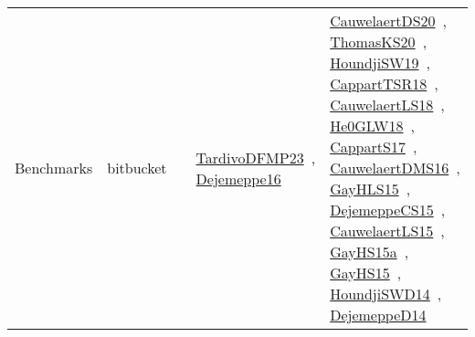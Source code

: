 {\begin{longtable}{lp{3cm}>{\raggedright\arraybackslash}p{6cm}>{\raggedright\arraybackslash}p{6cm}>{\raggedright\arraybackslash}p{8cm}}
Benchmarks & bitbucket &  & \href{../works/TardivoDFMP23.pdf}{TardivoDFMP23}~\cite{TardivoDFMP23}, \href{../works/Dejemeppe16.pdf}{Dejemeppe16}~\cite{Dejemeppe16} & \href{../works/CauwelaertDS20.pdf}{CauwelaertDS20}~\cite{CauwelaertDS20}, \href{../works/ThomasKS20.pdf}{ThomasKS20}~\cite{ThomasKS20}, \href{../works/HoundjiSW19.pdf}{HoundjiSW19}~\cite{HoundjiSW19}, \href{../works/CappartTSR18.pdf}{CappartTSR18}~\cite{CappartTSR18}, \href{../works/CauwelaertLS18.pdf}{CauwelaertLS18}~\cite{CauwelaertLS18}, \href{../works/He0GLW18.pdf}{He0GLW18}~\cite{He0GLW18}, \href{../works/CappartS17.pdf}{CappartS17}~\cite{CappartS17}, \href{../works/CauwelaertDMS16.pdf}{CauwelaertDMS16}~\cite{CauwelaertDMS16}, \href{../works/GayHLS15.pdf}{GayHLS15}~\cite{GayHLS15}, \href{../works/DejemeppeCS15.pdf}{DejemeppeCS15}~\cite{DejemeppeCS15}, \href{../works/CauwelaertLS15.pdf}{CauwelaertLS15}~\cite{CauwelaertLS15}, \href{../works/GayHS15a.pdf}{GayHS15a}~\cite{GayHS15a}, \href{../works/GayHS15.pdf}{GayHS15}~\cite{GayHS15}, \href{../works/HoundjiSWD14.pdf}{HoundjiSWD14}~\cite{HoundjiSWD14}, \href{../works/DejemeppeD14.pdf}{DejemeppeD14}~\cite{DejemeppeD14}\\

\end{longtable}}
